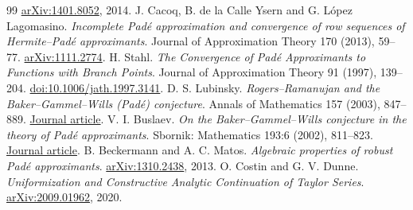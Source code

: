 \begin{thebibliography}{99}
\href{https://arxiv.org/abs/1401.8052}{arXiv:1401.8052}, 2014.
 J. Cacoq, B. de la Calle Ysern and G. L\'opez Lagomasino.
\emph{Incomplete Pad\'e approximation and convergence of row sequences of
Hermite--Pad\'e approximants}.
Journal of Approximation Theory 170 (2013), 59--77.
\href{https://arxiv.org/abs/1111.2774}{arXiv:1111.2774}.
 H. Stahl.
\emph{The Convergence of Pad\'e Approximants to Functions with Branch Points}.
Journal of Approximation Theory 91 (1997), 139--204.
\href{https://doi.org/10.1006/jath.1997.3141}{doi:10.1006/jath.1997.3141}.
 D. S. Lubinsky.
\emph{Rogers--Ramanujan and the Baker--Gammel--Wills (Pad\'e) conjecture}.
Annals of Mathematics 157 (2003), 847--889.
\href{https://annals.math.princeton.edu/2003/157-3/p04}{Journal article}.
 V. I. Buslaev.
\emph{On the Baker--Gammel--Wills conjecture in the theory of Pad\'e approximants}.
Sbornik: Mathematics 193:6 (2002), 811--823.
\href{https://www.mathnet.ru/eng/sm658}{Journal article}.
 B. Beckermann and A. C. Matos.
\emph{Algebraic properties of robust Pad\'e approximants}.
\href{https://arxiv.org/abs/1310.2438}{arXiv:1310.2438}, 2013.
 O. Costin and G. V. Dunne.
\emph{Uniformization and Constructive Analytic Continuation of Taylor Series}.
\href{https://arxiv.org/abs/2009.01962}{arXiv:2009.01962}, 2020.
\end{thebibliography}
